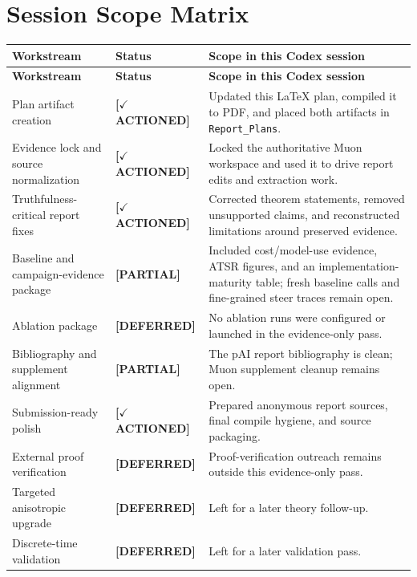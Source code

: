 \documentclass[11pt]{article}
\newcommand{\actioned}{\textbf{\textcolor{green!45!black}{[$\checkmark$ ACTIONED]}}}
\newcommand{\partialdone}{\textbf{\textcolor{orange!75!black}{[PARTIAL]}}}
\newcommand{\deferred}{\textbf{\textcolor{blue!65!black}{[DEFERRED]}}}
\begin{document}
\section*{Session Scope Matrix}
\small
\begin{longtable}{>{\raggedright\arraybackslash}p{} >{\raggedright\arraybackslash}p{} >{\raggedright\arraybackslash}p{}}
\toprule
\textbf{Workstream} & \textbf{Status} & \textbf{Scope in this Codex session} \\
\midrule
\endfirsthead
\toprule
\textbf{Workstream} & \textbf{Status} & \textbf{Scope in this Codex session} \\
\midrule
\endhead
Plan artifact creation & \actioned{} & Updated this \LaTeX{} plan, compiled it to PDF, and placed both artifacts in \texttt{Report\_Plans}. \\
Evidence lock and source normalization & \actioned{} & Locked the authoritative Muon workspace and used it to drive report edits and extraction work. \\
Truthfulness-critical report fixes & \actioned{} & Corrected theorem statements, removed unsupported claims, and reconstructed limitations around preserved evidence. \\
Baseline and campaign-evidence package & \partialdone{} & Included cost/model-use evidence, ATSR figures, and an implementation-maturity table; fresh baseline calls and fine-grained steer traces remain open. \\
Ablation package & \deferred{} & No ablation runs were configured or launched in the evidence-only pass. \\
Bibliography and supplement alignment & \partialdone{} & The pAI report bibliography is clean; Muon supplement cleanup remains open. \\
Submission-ready polish & \actioned{} & Prepared anonymous report sources, final compile hygiene, and source packaging. \\
External proof verification & \deferred{} & Proof-verification outreach remains outside this evidence-only pass. \\
Targeted anisotropic upgrade & \deferred{} & Left for a later theory follow-up. \\
Discrete-time validation & \deferred{} & Left for a later validation pass. \\
\bottomrule
\end{longtable}
\normalsize
\end{document}
